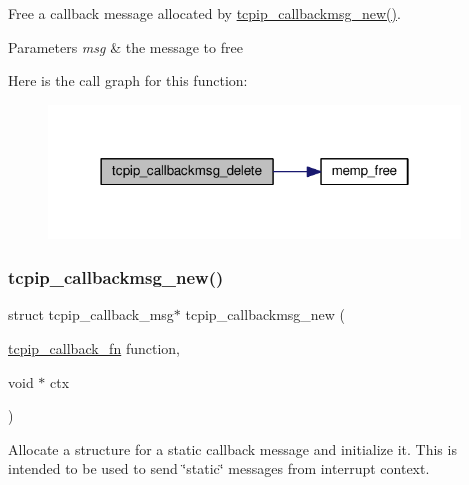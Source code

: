 Free a callback message allocated by \hyperlink{native_2lwip_2src_2api_2tcpip_8c_aee14fa2587a9ba9d23e4c7e16c4526ac}{tcpip\+\_\+callbackmsg\+\_\+new()}.


\begin{DoxyParams}{Parameters}
{\em msg} & the message to free \\
\hline
\end{DoxyParams}
Here is the call graph for this function\+:
\nopagebreak
\begin{figure}[H]
\begin{center}
\leavevmode
\includegraphics[width=310pt]{openmote-cc2538_2lwip_2src_2include_2lwip_2tcpip_8h_ac5b7a59f4c3f5f721ab9ee81f231c9fd_cgraph}
\end{center}
\end{figure}
\mbox{\label{openmote-cc2538_2lwip_2src_2include_2lwip_2tcpip_8h_aee14fa2587a9ba9d23e4c7e16c4526ac}} 
\subsubsection{\texorpdfstring{tcpip\+\_\+callbackmsg\+\_\+new()}{tcpip\_callbackmsg\_new()}}
{\footnotesize\ttfamily struct tcpip\+\_\+callback\+\_\+msg$\ast$ tcpip\+\_\+callbackmsg\+\_\+new (\begin{DoxyParamCaption}\item[{\hyperlink{openmote-cc2538_2lwip_2src_2include_2lwip_2tcpip_8h_a35203296bb838f3b493839ffc6e7285d}{tcpip\+\_\+callback\+\_\+fn}}]{function,  }\item[{void $\ast$}]{ctx }\end{DoxyParamCaption})}

Allocate a structure for a static callback message and initialize it. This is intended to be used to send \char`\"{}static\char`\"{} messages from interrupt context.


